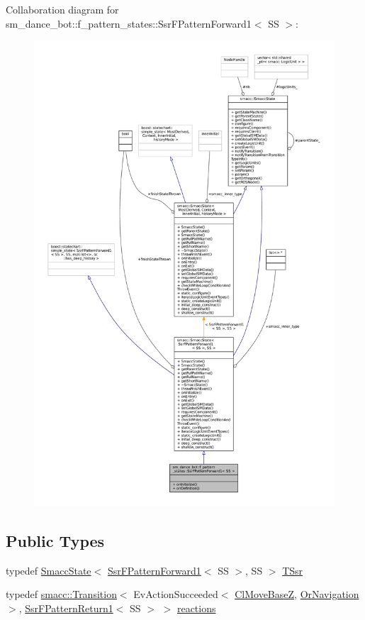 Collaboration diagram for sm\+\_\+dance\+\_\+bot\+:\+:f\+\_\+pattern\+\_\+states\+:\+:Ssr\+F\+Pattern\+Forward1$<$ SS $>$\+:
\nopagebreak
\begin{figure}[H]
\begin{center}
\leavevmode
\includegraphics[width=350pt]{structsm__dance__bot_1_1f__pattern__states_1_1SsrFPatternForward1__coll__graph}
\end{center}
\end{figure}
\subsection*{Public Types}
\begin{DoxyCompactItemize}
\item 
typedef \hyperlink{classSmaccState}{Smacc\+State}$<$ \hyperlink{structsm__dance__bot_1_1f__pattern__states_1_1SsrFPatternForward1}{Ssr\+F\+Pattern\+Forward1}$<$ SS $>$, SS $>$ \hyperlink{structsm__dance__bot_1_1f__pattern__states_1_1SsrFPatternForward1_abe4bb29cc1ff55c683530635291daccd}{T\+Ssr}
\item 
typedef \hyperlink{classsmacc_1_1Transition}{smacc\+::\+Transition}$<$ Ev\+Action\+Succeeded$<$ \hyperlink{classmove__base__z__client_1_1ClMoveBaseZ}{Cl\+Move\+BaseZ}, \hyperlink{classsm__dance__bot_1_1OrNavigation}{Or\+Navigation} $>$, \hyperlink{structsm__dance__bot_1_1f__pattern__states_1_1SsrFPatternReturn1}{Ssr\+F\+Pattern\+Return1}$<$ SS $>$ $>$ \hyperlink{structsm__dance__bot_1_1f__pattern__states_1_1SsrFPatternForward1_a5ab4007c8f9342d838fd51a61d263fd3}{reactions}
\end{DoxyCompactItemize}
